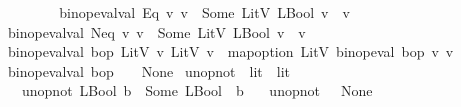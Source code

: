 \begin{isabellebody}
\ \ \ \isanewline
\ \ \isanewline
\ \ \ {\isachardoublequoteopen}binop{\isacharunderscore}{\kern0pt}eval{\isacharunderscore}{\kern0pt}val\ Eq\ v{}\ v{}\ {\isacharequal}{\kern0pt}\ Some\ {\isacharparenleft}{\kern0pt}LitV\ {\isacharparenleft}{\kern0pt}LBool\ {\isacharparenleft}{\kern0pt}v{}\ {\isacharequal}{\kern0pt}\ v{}{\isacharparenright}{\kern0pt}{\isacharparenright}{\kern0pt}{\isacharparenright}{\kern0pt}{\isachardoublequoteclose}\isanewline
\ {\isacharbar}{\kern0pt}\ {\isachardoublequoteopen}binop{\isacharunderscore}{\kern0pt}eval{\isacharunderscore}{\kern0pt}val\ Neq\ v{}\ v{}\ {\isacharequal}{\kern0pt}\ Some\ {\isacharparenleft}{\kern0pt}LitV\ {\isacharparenleft}{\kern0pt}LBool\ {\isacharparenleft}{\kern0pt}v{}\ {\isasymnoteq}\ v{}{\isacharparenright}{\kern0pt}{\isacharparenright}{\kern0pt}{\isacharparenright}{\kern0pt}{\isachardoublequoteclose}\isanewline
\ {\isacharbar}{\kern0pt}\ {\isachardoublequoteopen}binop{\isacharunderscore}{\kern0pt}eval{\isacharunderscore}{\kern0pt}val\ bop\ {\isacharparenleft}{\kern0pt}LitV\ v{}{\isacharparenright}{\kern0pt}\ {\isacharparenleft}{\kern0pt}LitV\ v{}{\isacharparenright}{\kern0pt}\ {\isacharequal}{\kern0pt}\ map{\isacharunderscore}{\kern0pt}option\ LitV\ {\isacharparenleft}{\kern0pt}binop{\isacharunderscore}{\kern0pt}eval\ bop\ v{}\ v{}{\isacharparenright}{\kern0pt}{\isachardoublequoteclose}\isanewline
\ {\isacharbar}{\kern0pt}\ {\isachardoublequoteopen}binop{\isacharunderscore}{\kern0pt}eval{\isacharunderscore}{\kern0pt}val\ bop\ {\isacharunderscore}{\kern0pt}\ {\isacharunderscore}{\kern0pt}\ {\isacharequal}{\kern0pt}\ None{\isachardoublequoteclose}\isanewline
\isanewline
{}\isamarkupfalse%
\ unop{\isacharunderscore}{\kern0pt}not\ {\isacharcolon}{\kern0pt}{\isacharcolon}{\kern0pt}\ {\isachardoublequoteopen}lit\ {\isasymrightharpoonup}\ lit{\isachardoublequoteclose}\isanewline
\ \ \isanewline
\ \ \ \ {\isachardoublequoteopen}unop{\isacharunderscore}{\kern0pt}not\ {\isacharparenleft}{\kern0pt}LBool\ b{\isacharparenright}{\kern0pt}\ {\isacharequal}{\kern0pt}\ Some\ {\isacharparenleft}{\kern0pt}LBool\ {\isacharparenleft}{\kern0pt}{\isasymnot}\ b{\isacharparenright}{\kern0pt}{\isacharparenright}{\kern0pt}{\isachardoublequoteclose}\isanewline
\ \ {\isacharbar}{\kern0pt}\ {\isachardoublequoteopen}unop{\isacharunderscore}{\kern0pt}not\ {\isacharunderscore}{\kern0pt}\ {\isacharequal}{\kern0pt}\ None{\isachardoublequoteclose}\isanewline

\end{isabellebody}
